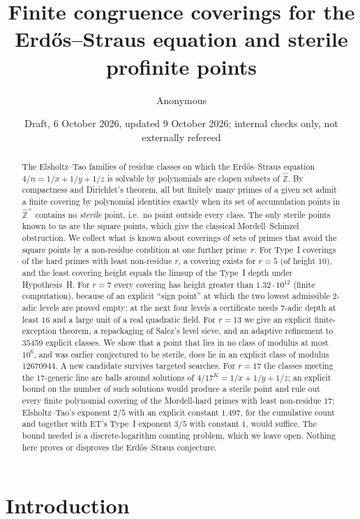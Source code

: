 \documentclass[11pt,reqno]{amsart}
\title[Finite coverings for Erd\H{o}s--Straus and sterile points]{Finite congruence coverings for the Erd\H{o}s--Straus equation and sterile profinite points}
\author{Anonymous}
\date{Draft, 6 October 2026, updated 9 October 2026; internal checks only, not externally refereed}
\theoremstyle{definition}
\begin{document}
\begin{abstract}
The Elsholtz--Tao families of residue classes on which the
Erd\H{o}s--Straus equation $4/n=1/x+1/y+1/z$ is solvable by polynomials
are clopen subsets of $\widehat{\mathbb Z}$.  By compactness and
Dirichlet's theorem, all but finitely many primes of a given set admit
a finite covering by polynomial identities exactly when its set of accumulation points in
$\widehat{\mathbb Z}^\times$ contains no \emph{sterile} point, i.e.\ no
point outside every class.  The only sterile points known to us are the square
points, which give the classical Mordell--Schinzel obstruction.  We
collect what is known about coverings of sets of primes that avoid the
square points by a non-residue condition at one further prime~$r$.  For
Type~I coverings of the hard primes with least non-residue $r$, a covering
exists for $r=5$ (of height $10$), and the least covering height equals
the limsup of the Type~I depth under Hypothesis~H.  For $r=7$ every
covering has height greater than $1.32\cdot10^{12}$ (finite computation),
because of an explicit ``sign point'' at which the two lowest admissible
$2$-adic levels are proved empty; at the next four levels a certificate
needs $7$-adic depth at least $16$ and a large unit of a real quadratic
field.  For $r=13$ we give an explicit
finite-exception theorem, a repackaging of Salez's level sieve, and an
adaptive refinement to $35459$ explicit classes.  We show
that a point that lies in no class of modulus at most $10^6$, and was
earlier conjectured to be sterile, does lie in an explicit class of
modulus $12670944$.  A new candidate survives targeted searches.
For $r=17$ the classes meeting the $17$-generic line are balls around
solutions of $4/17^K=1/x+1/y+1/z$; an explicit bound on the number of
such solutions would produce a sterile point and rule out every finite
polynomial covering of the Mordell-hard primes with least non-residue
$17$; Elsholtz--Tao's exponent $2/5$ with an explicit constant $1.497$,
for the cumulative count and together with ET's Type~I exponent $3/5$
with constant $1$, would suffice.%
  The bound needed is a discrete-logarithm counting problem,
which we leave open.  Nothing here proves or disproves the Erd\H{o}s--Straus
conjecture.
\end{abstract}
\maketitle

\section{Introduction}\label{sec:intro}
\end{document}
